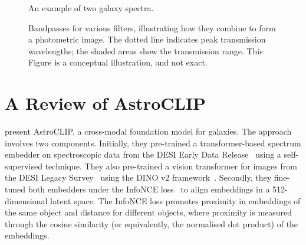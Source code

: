 \documentclass[a4paper,11pt]{article}
\begin{document}
\begin{figure}[t]
    \centering
    \caption{An example of two galaxy spectra.}
    \label{fig:example-spectra}
\end{figure}
\begin{figure}[t]
    \centering
    \caption{Bandpasses for various filters, illustrating how they combine to form a photometric image.
    The dotted line indicates peak transmission wavelengths; the shaded areas show the transmission range.
    This Figure is a conceptual illustration, and not exact.}
    \label{fig:bandpass-illustration}
\end{figure}

\section{A Review of AstroCLIP}\label{sec:original-paper}
\cite{astroclip} present AstroCLIP, a cross-modal foundation model for galaxies.
The approach involves two components.
Initially, they pre-trained a transformer-based spectrum embedder on spectroscopic data from the DESI Early Data
Release~\citep{desiearly2023} using a self-supervised technique.
They also pre-trained a vision transformer for images from the DESI Legacy Survey~\citep{desilegacy2018} using the DINO
v2 framework~\citep{oquab2024}.
Secondly, they fine-tuned both embedders under the InfoNCE loss~\citep{oord2019} to align embeddings in a 512-dimensional
latent space.
The InfoNCE loss promotes proximity in embeddings of the same object and distance for different objects,
where proximity is measured through the cosine similarity (or equivalently, the normalised dot product)
of the embeddings.
\end{document}
